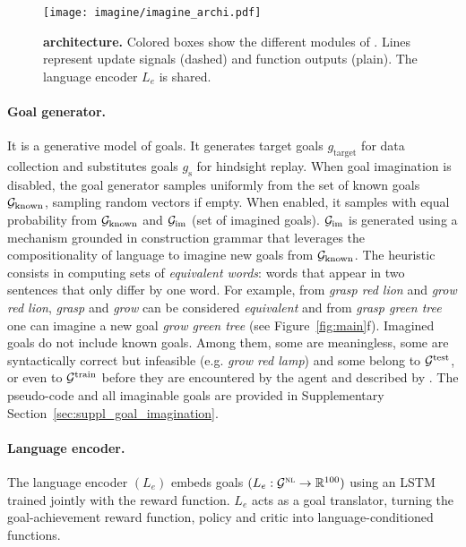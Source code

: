 \begin{figure}[!h]
    \centering
     \texttt{[image: imagine/imagine\_archi.pdf]}
    
     \caption{\textbf{\imagine architecture.} Colored boxes show the different modules of \imagine. Lines represent update signals (dashed) and function outputs (plain). The language encoder $L_e$ is shared.}  
    \vspace{-0.25cm}
\label{fig:architecture}
\end{figure}

\paragraph{Goal generator.} It is a generative model of \NL  goals. It generates target goals $g_\text{target}$ for data collection and substitutes goals $g_\text{s}$ for hindsight replay. When goal imagination is disabled, the goal generator samples uniformly from the set of known goals $\mathcal{G}_\text{known}$, sampling random vectors if empty. When enabled, it samples with equal probability from $\mathcal{G}_\text{known}$ and $\mathcal{G}_\text{im}$ (set of imagined goals). $\mathcal{G}_\text{im}$ is generated using a mechanism grounded in construction grammar that leverages the compositionality of language to imagine new goals from $\mathcal{G}_\text{known}$. The heuristic consists in computing sets of \textit{equivalent words}: words that appear in two sentences that only differ by one word. For example, from \textit{grasp red lion} and \textit{grow red lion}, \textit{grasp} and \textit{grow} can be considered \textit{equivalent} and from \textit{grasp green tree} one can imagine a new goal \textit{grow green tree} (see Figure~\ref{fig:main}f). Imagined goals do not include known goals. Among them, some are meaningless, some are syntactically correct but infeasible (e.g. \textit{grow red lamp}) and some belong to $\mathcal{G}^\text{test}$, or even to $\mathcal{G}^{\text{train}}$ before they are encountered by the agent and described by \SP. The pseudo-code and all imaginable goals are provided in Supplementary Section~\ref{sec:suppl_goal_imagination}. 



\paragraph{Language encoder.} The language encoder $(L_e)$ embeds \NL  goals $(L_e:\mathcal{G}^\text{\textsc{nl}} \to \mathbb{R}^{100})$ using an LSTM \cite{hochreiter1997lstm} trained jointly with the reward function.  $L_e$ acts as a goal translator, turning the goal-achievement reward function, policy and critic into language-conditioned functions.

